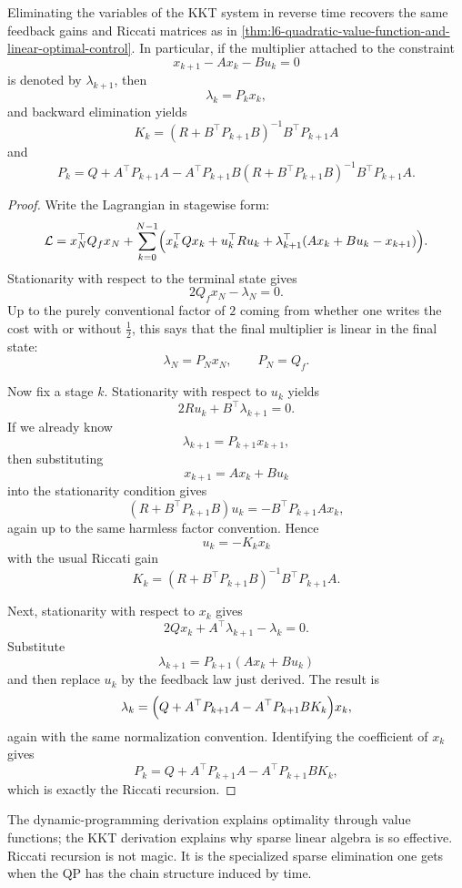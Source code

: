 \begin{theorem}\label{thm:l6-riccati-recursion-from-block-elimination-of-the-kkt-system}
	Eliminating the variables of the KKT system in reverse time recovers the same feedback gains and Riccati matrices as in \autoref{thm:l6-quadratic-value-function-and-linear-optimal-control}. In particular, if the multiplier attached to the constraint
	\[
		x_{k+1}-Ax_k-Bu_k=0
	\]
	is denoted by $\lambda_{k+1}$, then
	\[
		\lambda_k=P_k x_k,
	\]
	and backward elimination yields
	\[
		K_k=\left(R+B^\top P_{k+1}B\right)^{-1}B^\top P_{k+1}A
	\]
	and
	\[
		P_k = Q + A^\top P_{k+1}A - A^\top P_{k+1}B\left(R+B^\top P_{k+1}B\right)^{-1}B^\top P_{k+1}A.
	\]
\end{theorem}
\begin{proof}
	Write the Lagrangian in stagewise form:
	\[
		\mathcal{L}
		=
		x_N^\top Q_f x_N
		+
		\sum_{k=0}^{N-1}
		\Bigl(
			x_k^\top Q x_k + u_k^\top R u_k + \lambda_{k+1}^\top(Ax_k+Bu_k-x_{k+1})
		\Bigr).
	\]
	Stationarity with respect to the terminal state gives
	\[
		2Q_f x_N-\lambda_N=0.
	\]
	Up to the purely conventional factor of $2$ coming from whether one writes the cost with or without $\frac12$, this says that the final multiplier is linear in the final state:
	\[
		\lambda_N=P_N x_N,
		\qquad
		P_N=Q_f.
	\]

	Now fix a stage $k$. Stationarity with respect to $u_k$ yields
	\[
		2Ru_k + B^\top \lambda_{k+1}=0.
	\]
	If we already know
	\[
		\lambda_{k+1}=P_{k+1}x_{k+1},
	\]
	then substituting
	\[
		x_{k+1}=Ax_k+Bu_k
	\]
	into the stationarity condition gives
	\[
		\left(R+B^\top P_{k+1}B\right)u_k = -B^\top P_{k+1}A x_k,
	\]
	again up to the same harmless factor convention. Hence
	\[
		u_k=-K_k x_k
	\]
	with the usual Riccati gain
	\[
		K_k=\left(R+B^\top P_{k+1}B\right)^{-1}B^\top P_{k+1}A.
	\]

	Next, stationarity with respect to $x_k$ gives
	\[
		2Qx_k + A^\top \lambda_{k+1} - \lambda_k = 0.
	\]
	Substitute
	\[
		\lambda_{k+1}=P_{k+1}(Ax_k+Bu_k)
	\]
	and then replace $u_k$ by the feedback law just derived. The result is
	\[
		\lambda_k
		=
		\Bigl(
			Q + A^\top P_{k+1}A - A^\top P_{k+1}B K_k
		\Bigr)x_k,
	\]
	again with the same normalization convention. Identifying the coefficient of $x_k$ gives
	\[
		P_k = Q + A^\top P_{k+1}A - A^\top P_{k+1}B K_k,
	\]
	which is exactly the Riccati recursion.
\end{proof}

\begin{remark}
	The dynamic-programming derivation explains optimality through value functions; the KKT derivation explains why sparse linear algebra is so effective. Riccati recursion is not magic. It is the specialized sparse elimination one gets when the QP has the chain structure induced by time.
\end{remark}

